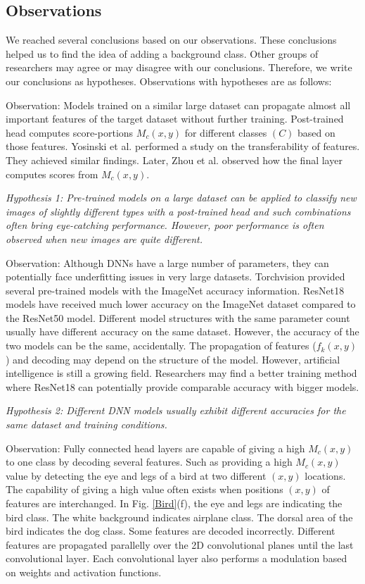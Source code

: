 \documentclass{article}
\begin{document}
\subsection{Observations}
We reached several conclusions based on our observations. These conclusions helped us to find the idea of adding a background class. Other groups of researchers may agree or may disagree with our conclusions. Therefore, we write our conclusions as hypotheses. Observations with hypotheses are as follows:  

Observation: Models trained on a similar large dataset can propagate almost all important features of the target dataset without further training. Post-trained head computes score-portions $M_c (x,y)$ for different classes $(C)$ based on those features. Yosinski et al. \cite{yosinski2014transferable} performed a study on the transferability of features. They achieved similar findings. Later, Zhou et al. \cite{zhou2016learning} observed how the final layer computes scores from $M_c (x,y)$.

\emph{Hypothesis 1: Pre-trained models on a large dataset can be applied to classify new images of slightly different types with a post-trained head and such combinations often bring eye-catching performance. However, poor performance is often observed when new images are quite different.} 


Observation: Although DNNs have a large number of parameters, they can potentially face underfitting issues in very large datasets. Torchvision \cite{marcel2010torchvision} provided several pre-trained models with the ImageNet accuracy information. ResNet18 models have received much lower accuracy on the ImageNet dataset compared to the ResNet50 model. Different model structures with the same parameter count usually have different accuracy on the same dataset. However, the accuracy of the two models can be the same, accidentally. The propagation of features ($f_k (x,y)$) and decoding may depend on the structure of the model. However, artificial intelligence is still a growing field. Researchers may find a better training method where ResNet18 can potentially provide comparable accuracy with bigger models. 

\emph{Hypothesis 2: Different DNN models usually exhibit different accuracies for the same dataset and training conditions. }



Observation: Fully connected head layers are capable of giving a high $M_c (x,y)$ to one class by decoding several features. Such as providing a high $M_c (x,y)$ value by detecting the eye and legs of a bird at two different $(x,y)$ locations. The capability of giving a high value often exists when positions $(x,y)$ of features are interchanged. In Fig. \ref{Bird}(f), the eye and legs are indicating the bird class. The white background indicates airplane class. The dorsal area of the bird indicates the dog class. Some features are decoded incorrectly. Different features are propagated parallelly over the 2D convolutional planes until the last convolutional layer. Each convolutional layer also performs a modulation based on weights and activation functions. 
\end{document}
